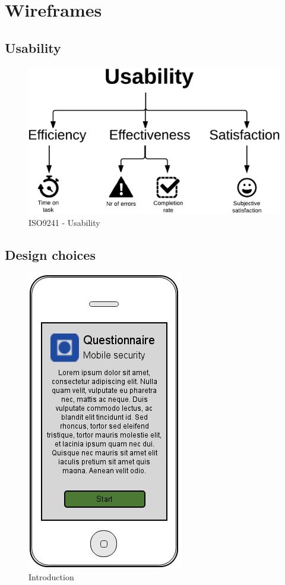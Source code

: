 \section{Wireframes}
\label{sec:wireframes}


  \subsection{Usability}

  \begin{figure}[H]
    \centering
    \includegraphics[scale=0.25]{pics/usability.png}
    \caption[ISO9241 - Usability]{ISO9241 - Usability \cite{ISO9241}}
    \label{fig:usability}
  \end{figure}

  \subsection{Design choices}
    
    \begin{figure}
      \centering
      \vspace{-5pt}
      \includegraphics[scale=0.40]{screens/v3/mobile/mobile1-1.png}
      \caption{Introduction}
      \label{fig:wireframe1}
    \end{figure}
    
